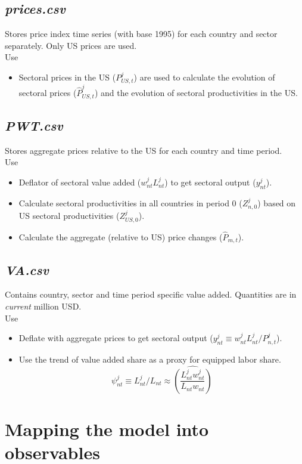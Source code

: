\documentclass[11pt,oneside,a4paper]{article}
\begin{document}
\subsection{\textsl{prices.csv}}
Stores price index time series (with base 1995) for each country and sector separately. Only US prices are used.\\
Use
\begin{itemize}
  \item Sectoral prices in the US ($P^j_{US,t}$) are used to calculate the evolution of sectoral prices ($\hat{P}^j_{US,t}$) and the evolution of sectoral productivities in the US.
\end{itemize}

\subsection{\textsl{PWT.csv}}
Stores aggregate prices relative to the US for each country and time period.\\
Use
\begin{itemize}
  \item Deflator of sectoral value added ($w^j_{nt}L^j_{nt}$) to get sectoral output ($y^j_{nt}$).
  \item Calculate sectoral productivities in all countries in period 0 ($Z^j_{n,0}$) based on US sectoral productivities ($Z^j_{US,0}$).
  \item Calculate the aggregate (relative to US) price changes ($\hat{P}_{m,t}$).
\end{itemize}

\subsection{\textsl{VA.csv}}
Contains country, sector and time period specific value added. Quantities are in \emph{current} million USD.\\
Use
\begin{itemize}
  \item Deflate with aggregate prices to get sectoral output ($y^j_{nt} \equiv w^j_{nt}L^j_{nt} / P^j_{n,t} $).
  \item Use the trend of value added share as a proxy for equipped labor share.
  $$\psi^j_{nt} \equiv L^j_{nt} / L_{nt} \approx \widehat{\left(\frac{L^j_{nt} w^j_{nt}}{L_{nt} w_{nt}}\right)}$$
\end{itemize}


\newpage
\section{Mapping the model into observables}
\end{document}
